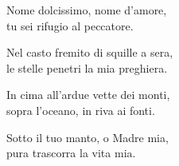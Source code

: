 
\strofa Nome dolcissimo, nome d'amore,\\
tu sei rifugio al peccatore.

\spazio

 

\spazio

\strofa Nel casto fremito di squille a sera,\\
le stelle penetri la mia preghiera.

\spazio

 

\spazio

\strofa In cima all'ardue vette dei monti,\\
sopra l'oceano, in riva ai fonti.

\spazio

 

\spazio

\strofa Sotto il tuo manto, o Madre mia,\\
pura trascorra la vita mia.

\spazio

 
